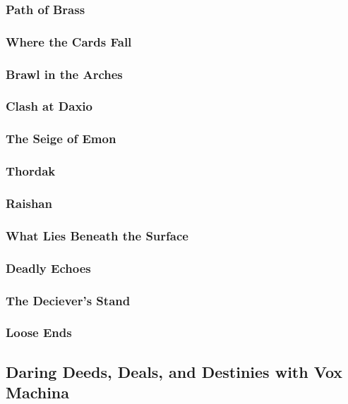         \subsubsection{Path of Brass}
        \subsubsection{Where the Cards Fall}
        \subsubsection{Brawl in the Arches}
        \subsubsection{Clash at Daxio}
        \subsubsection{The Seige of Emon}
        \subsubsection{Thordak}
        \subsubsection{Raishan}
        \subsubsection{What Lies Beneath the Surface}
        \subsubsection{Deadly Echoes}
        \subsubsection{The Deciever's Stand} %
        \subsubsection{Loose Ends}
        
    \newpage
    \subsection{Daring Deeds, Deals, and Destinies with Vox Machina} \vspace*{\fill}
    \newpage
